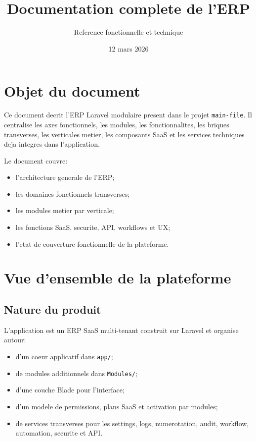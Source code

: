 \documentclass[11pt,a4paper]{article}
\title{Documentation complete de l'ERP}
\author{Reference fonctionnelle et technique}
\date{12 mars 2026}
\begin{document}
\maketitle
\tableofcontents
\newpage

\section{Objet du document}
Ce document decrit l'ERP Laravel modulaire present dans le projet \texttt{main-file}. Il centralise les axes fonctionnels, les modules, les fonctionnalites, les briques transverses, les verticales metier, les composants SaaS et les services techniques deja integres dans l'application.

Le document couvre:
\begin{itemize}[leftmargin=1.2cm]
    \item l'architecture generale de l'ERP;
    \item les domaines fonctionnels transverses;
    \item les modules metier par verticale;
    \item les fonctions SaaS, securite, API, workflows et UX;
    \item l'etat de couverture fonctionnelle de la plateforme.
\end{itemize}

\section{Vue d'ensemble de la plateforme}
\subsection{Nature du produit}
L'application est un ERP SaaS multi-tenant construit sur Laravel et organise autour:
\begin{itemize}[leftmargin=1.2cm]
    \item d'un coeur applicatif dans \texttt{app/};
    \item de modules additionnels dans \texttt{Modules/};
    \item d'une couche Blade pour l'interface;
    \item d'un modele de permissions, plans SaaS et activation par modules;
    \item de services transverses pour les settings, logs, numerotation, audit, workflow, automation, securite et API.
\end{itemize}
\end{document}
